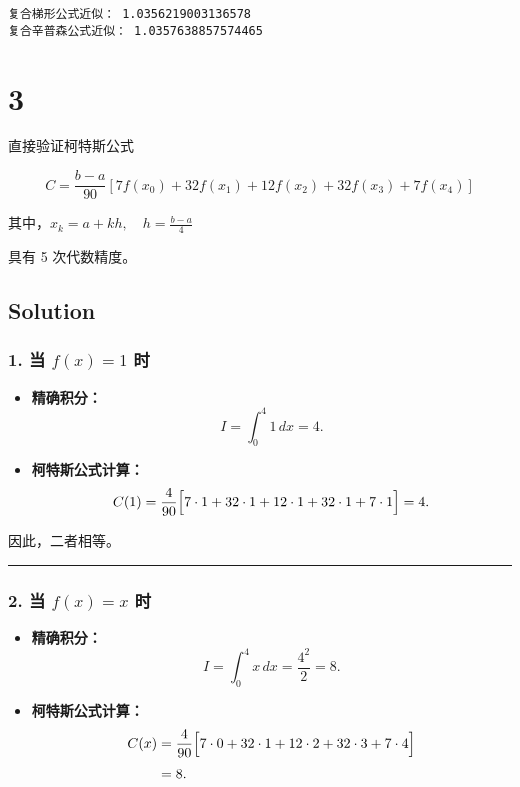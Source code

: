 \documentclass[11pt]{article}
\begin{document}
    \begin{Verbatim}[commandchars=\\\{\}]
复合梯形公式近似： 1.0356219003136578
复合辛普森公式近似： 1.0357638857574465
    \end{Verbatim}

    \section{3}\label{section}

直接验证柯特斯公式

\[
C = \frac{b - a}{90}\left[7f(x_0) + 32f(x_1) + 12f(x_2) + 32f(x_3) + 7f(x_4)\right]
\]

其中，\(x_k = a + kh, \quad h = \frac{b - a}{4}\)

具有 5 次代数精度。

\subsection{Solution}\label{solution}

\subsubsection{\texorpdfstring{1. 当 \(f(x)=1\)
时}{1. 当 f(x)=1 时}}\label{ux5f53-fx1-ux65f6}

\begin{itemize}
\item
  \textbf{精确积分：} \[
  I = \int_0^4 1\,dx=4.
  \]
\item
  \textbf{柯特斯公式计算：} \[
  C(1)=\frac{4}{90}\Bigl[7\cdot1+32\cdot1+12\cdot1+32\cdot1+7\cdot1\Bigr]=4.
  \]
\end{itemize}

因此，二者相等。

\begin{center}\rule{0.5\linewidth}{0.5pt}\end{center}

\subsubsection{\texorpdfstring{2. 当 \(f(x)=x\)
时}{2. 当 f(x)=x 时}}\label{ux5f53-fxx-ux65f6}

\begin{itemize}
\item
  \textbf{精确积分：} \[
  I = \int_0^4 x\,dx=\frac{4^2}{2}=8.
  \]
\item
  \textbf{柯特斯公式计算：} \[
  \begin{aligned}
  C(x)
  &=\frac{4}{90}\Bigl[7\cdot0+32\cdot1+12\cdot2+32\cdot3+7\cdot4\Bigr]\\[1mm]&=8.
  \end{aligned}
  \]
\end{itemize}
\end{document}
